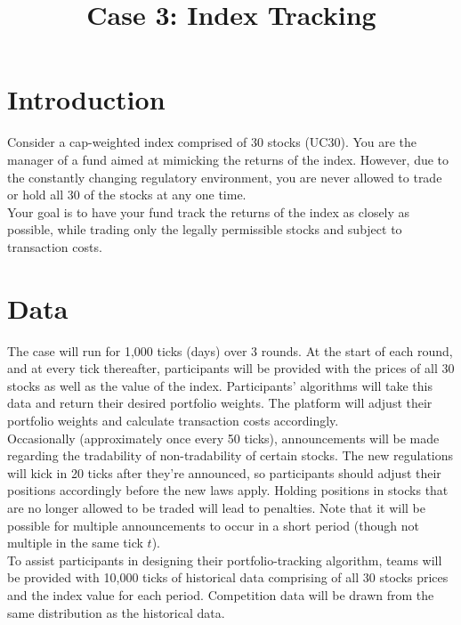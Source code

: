 \documentclass{amsart}
\renewcommand{\_}[1]{\underline{ #1 }}
\theoremstyle{definition}
\numberwithin{equation}{subsection}
\begin{document}
\title{Case 3: Index Tracking}
\maketitle

\setlength{\parindent}{0.5cm}
\section{Introduction}

Consider a cap-weighted index comprised of 30 stocks (UC30). You are the manager of a fund aimed at mimicking the returns of the index. However, due to the constantly changing regulatory environment, you are never allowed to trade or hold all 30 of the stocks at any one time.\\

Your goal is to have your fund track the returns of the index as closely as possible, while trading only the legally permissible stocks and subject to transaction costs.

\section{Data}
The case will run for 1,000 ticks (days) over 3 rounds. At the start of each round, and at every tick thereafter, participants will be provided with the prices of all 30 stocks as well as the value of the index. Participants' algorithms will take this data and return their desired portfolio weights. The platform will adjust their portfolio weights and calculate transaction costs accordingly. \\

Occasionally (approximately once every 50 ticks), announcements will be made regarding the tradability of non-tradability of certain stocks. The new regulations will kick in 20 ticks after they're announced, so participants should adjust their positions accordingly before the new laws apply. Holding positions in stocks that are no longer allowed to be traded will lead to penalties. Note that it will be possible for multiple announcements to occur in a short period (though not multiple in the same tick $t$).\\

To assist participants in designing their portfolio-tracking algorithm, teams will be provided with 10,000 ticks of historical data comprising of all 30 stocks prices and the index value for each period. Competition data will be drawn from the same distribution as the historical data. \\
\end{document}

